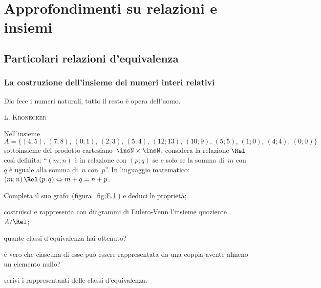 
\chapter{Approfondimenti su relazioni e insiemi}

\section{Particolari relazioni d'equivalenza}

\subsection{La costruzione dell'insieme dei numeri interi relativi}\label{sect:ins_numeri_interi_relativi}

\epigraph{Dio fece i numeri naturali, tutto il resto è opera dell'uomo.}{\scshape{L. Kronecker}}

\begin{exrig}
 \begin{esempio}
 \label{ex:E.1}
Nell'insieme
\[A = \{(4;5)\text{, }(7;8)\text{, }(0;1)\text{, }(2;3)\text{, }(5;4)\text{, }(12;13)\text{, }(10;9)\text{, }(5;5)\text{, }(1;0)\text{, }(4;4)\text{, }(0;0)\}\]
sottoinsieme del prodotto cartesiano~$\insN \times \insN$, considera la relazione $\Rel$ così definita:
``$(m;n)$ è in relazione con $(p;q)$ se e solo se la somma di~$m$ con~$q$ è uguale alla somma di~$n$ con~$p$''.
In linguaggio matematico:~$(m;n) \,\Rel\, (p;q) \Leftrightarrow m+q = n+p$.

\begin{itemize*}
\item Completa il suo grafo~(figura~\ref{fig:E.1}) e deduci le proprietà;
\item costruisci e rappresenta con diagrammi di Eulero-Venn l'insieme quoziente~$A/\Rel$;
\item quante classi d'equivalenza hai ottenuto?
\item è vero che ciascuna di esse può essere rappresentata da una coppia avente almeno un elemento nullo?
\item scrivi i rappresentanti delle classi d'equivalenza.
\end{itemize*}
 \end{esempio}
\end{exrig}

